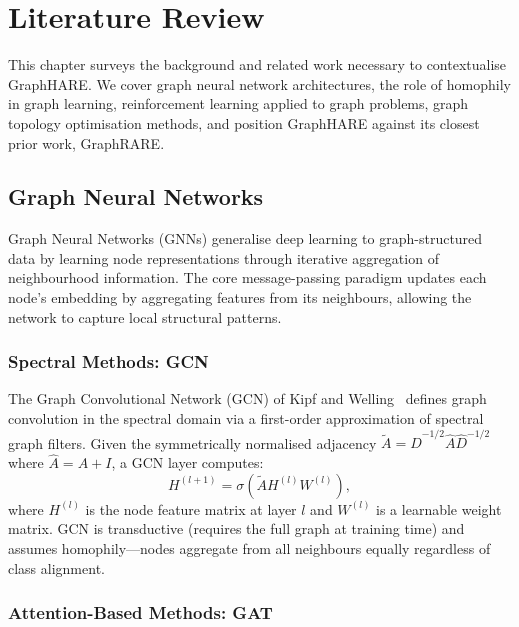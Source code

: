\chapter{Literature Review}

This chapter surveys the background and related work necessary to contextualise GraphHARE.
We cover graph neural network architectures, the role of homophily in graph learning,
reinforcement learning applied to graph problems, graph topology optimisation methods, and
position GraphHARE against its closest prior work, GraphRARE.

\section{Graph Neural Networks}

Graph Neural Networks (GNNs) generalise deep learning to graph-structured data by learning
node representations through iterative aggregation of neighbourhood information. The core
message-passing paradigm \cite{hamilton2017graphsage} updates each node's embedding by
aggregating features from its neighbours, allowing the network to capture local structural
patterns.

\subsection{Spectral Methods: GCN}

The Graph Convolutional Network (GCN) of Kipf and Welling~\cite{kipf2017gcn} defines graph
convolution in the spectral domain via a first-order approximation of spectral graph filters.
Given the symmetrically normalised adjacency $\tilde{A} = \hat{D}^{-1/2}\hat{A}\hat{D}^{-1/2}$
where $\hat{A} = A + I$, a GCN layer computes:
\begin{equation}
    H^{(l+1)} = \sigma\!\left(\tilde{A} H^{(l)} W^{(l)}\right),
\end{equation}
where $H^{(l)}$ is the node feature matrix at layer $l$ and $W^{(l)}$ is a learnable
weight matrix. GCN is transductive (requires the full graph at training time) and assumes
homophily---nodes aggregate from all neighbours equally regardless of class alignment.

\subsection{Attention-Based Methods: GAT}

